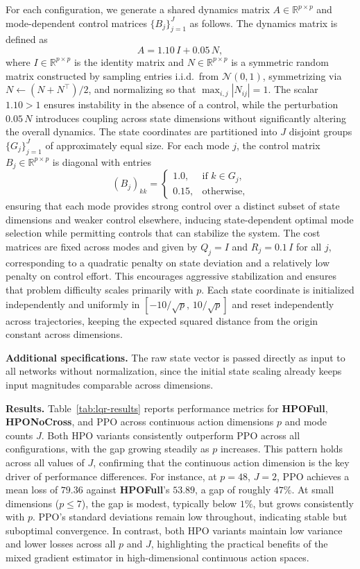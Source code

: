 \documentclass{article}
\theoremstyle{definition}
\theoremstyle{remark}
\begin{document}
For each configuration, we generate a shared dynamics matrix $A \in \mathbb{R}^{p 
\times p}$ and mode-dependent control matrices $\{B_j\}_{j=1}^J$ as follows. The 
dynamics matrix is defined as
\[
A = 1.10\, I + 0.05\, N,
\]
where $I \in \mathbb{R}^{p \times p}$ is the identity matrix and $N \in \mathbb{R}^{p 
\times p}$ is a symmetric random matrix constructed by sampling entries i.i.d.\ from 
$\mathcal{N}(0,1)$, symmetrizing via $N \leftarrow (N + N^\top)/2$, and normalizing so 
that $\max_{i,j} |N_{ij}| = 1$. The scalar $1.10 > 1$ ensures instability in the 
absence of a control, while the perturbation $0.05\,N$ introduces coupling across state 
dimensions without significantly altering the overall dynamics. The state coordinates 
are partitioned into $J$ disjoint groups $\{G_j\}_{j=1}^J$ of approximately equal size. 
For each mode $j$, the control matrix $B_j \in \mathbb{R}^{p \times p}$ is diagonal 
with entries
\[
(B_j)_{kk} =
\begin{cases}
1.0, & \text{if } k \in G_j,\\
0.15, & \text{otherwise,}
\end{cases}
\]
ensuring that each mode provides strong control over a distinct subset of state 
dimensions and weaker control elsewhere, inducing state-dependent optimal mode selection 
while permitting controls that can stabilize the system. The cost matrices are fixed 
across modes and given by $Q_j = I$ and $R_j = 0.1\,I$ for all $j$, corresponding to a 
quadratic penalty on state deviation and a relatively low penalty on control effort. 
This encourages aggressive stabilization and ensures that problem difficulty scales 
primarily with $p$. Each state coordinate is initialized independently and uniformly in 
$[-10/\sqrt{p},\, 10/\sqrt{p}]$ and reset independently across trajectories, keeping 
the expected squared distance from the origin constant across dimensions.

\textbf{Additional specifications.} The raw state vector is passed directly as input to 
all networks without normalization, since the initial state scaling already keeps input 
magnitudes comparable across dimensions.

\textbf{Results.} Table~\ref{tab:lqr-results} reports performance metrics for 
\textbf{HPOFull}, \textbf{HPONoCross}, and PPO across continuous action dimensions $p$ and mode counts 
$J$. Both HPO variants consistently outperform PPO across all configurations, with the 
gap growing steadily as $p$ increases. This pattern holds across all values of $J$, 
confirming that the continuous action dimension is the key driver of performance 
differences. For instance, at $p=48$, $J=2$, PPO achieves 
a mean loss of $79.36$ against \textbf{HPOFull}'s $53.89$, a gap of roughly $47\%$. At small 
dimensions ($p \leq 7$), the gap is modest, typically below $1\%$, but grows 
consistently with $p$. PPO's standard deviations remain low throughout, indicating 
stable but suboptimal convergence. In contrast, both HPO variants maintain low variance 
and lower losses across all $p$ and $J$, highlighting the practical benefits of the 
mixed gradient estimator in high-dimensional continuous action spaces.
\end{document}
